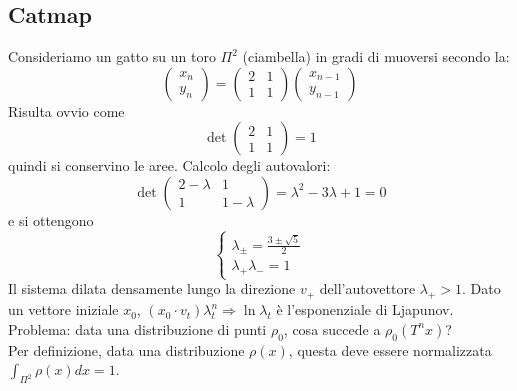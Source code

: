 \documentclass[12pt, a4paper]{book}
\theoremstyle{theorem}
\begin{document}
			\subsection{Catmap}
				Consideriamo un gatto su un toro $\Pi^{2}$ (ciambella) in gradi di muoversi secondo la:
				\begin{equation*}
					\left(
					\begin{matrix}
						x_{n} \\
						y_{n} 
					\end{matrix}
					\right)=
					\left(
					\begin{matrix}
						2 & 1\\
						1 & 1 
					\end{matrix}
					\right)
					\left(
					\begin{matrix}
						x_{n-1} \\
						y_{n-1} 
					\end{matrix}
					\right)
				\end{equation*}
				Risulta ovvio come
				\begin{equation*}
					\det
					\left(
						\begin{matrix}
							2 & 1\\
							1 & 1 
						\end{matrix}
					\right)=1
				\end{equation*}
				quindi si conservino le aree.
				Calcolo degli autovalori:
				\begin{equation*}
					\det
					\left(
						\begin{matrix}
							2-\lambda & 1\\
							1 & 1-\lambda
						\end{matrix}
					\right)=\lambda^{2}-3\lambda+1=0
				\end{equation*}
				e si ottengono
				\begin{equation*}
					\begin{cases}
						\lambda_{\pm}=\frac{3\pm\sqrt{5}}{2}\\
						\lambda_{+}\lambda_{-}=1
					\end{cases}
				\end{equation*}
				Il sistema dilata densamente lungo la direzione $v_{+}$ dell'autovettore $\lambda_{+}>1$.
				Dato un vettore iniziale $x_{0}$, $(x_{0}\cdot v_{t})\lambda_{t}^{n} \Rightarrow \ln\lambda_{t}$ è l'esponenziale di Ljapunov.
				Problema: data una distribuzione di punti $\rho_{0}$, cosa succede a $\rho_{0}(T^{n}x)$?
				\\Per definizione, data una distribuzione $\rho(x)$, questa deve essere normalizzata $\int_{\Pi^{2}}\rho(x)dx=1$.
\end{document}
